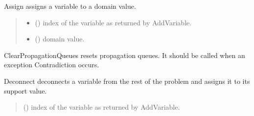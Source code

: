 \documentclass[letterpaper,10pt,openany,oneside,english]{sphinxmanual}
\begin{document}
\begin{fulllineitems}

\begin{fulllineitems}
\label{\detokenize{ref/ref_python:pytoulbar2.CFN.Assign}}
\pysigstartsignatures
{}
\pysigstopsignatures
\sphinxAtStartPar
Assign assigns a variable to a domain value.
\begin{quote}\begin{description}
\begin{itemize}
\item {} 
\sphinxAtStartPar
{} () \textendash{} index of the variable as returned by AddVariable.

\item {} 
\sphinxAtStartPar
{} () \textendash{} domain value.

\end{itemize}

\end{description}\end{quote}

\end{fulllineitems}


\begin{fulllineitems}
\label{\detokenize{ref/ref_python:pytoulbar2.CFN.ClearPropagationQueues}}
\pysigstartsignatures
{}
\pysigstopsignatures
\sphinxAtStartPar
ClearPropagationQueues resets propagation queues. It should be called when an exception Contradiction occurs.

\end{fulllineitems}


\begin{fulllineitems}
\label{\detokenize{ref/ref_python:pytoulbar2.CFN.Deconnect}}
\pysigstartsignatures
{}
\pysigstopsignatures
\sphinxAtStartPar
Deconnect deconnects a variable from the rest of the problem and assigns it to its support value.
\begin{quote}\begin{description}
\sphinxAtStartPar
{} () \textendash{} index of the variable as returned by AddVariable.


\end{description}
\end{quote}
\end{fulllineitems}
\end{fulllineitems}
\end{document}
